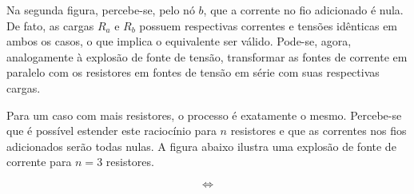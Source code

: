 \documentclass{article}
\numberwithin{equation}{section}
\newlength\Colsep
\begin{document}
Na segunda figura, percebe-se, pelo nó $b$, que a corrente no fio adicionado é nula. De fato, as cargas $R_a$ e $R_b$ possuem respectivas correntes e tensões idênticas em ambos os casos, o que implica o equivalente ser válido. Pode-se, agora, analogamente à explosão de fonte de tensão, transformar as fontes de corrente em paralelo com os resistores em fontes de tensão em série com suas respectivas cargas.

Para um caso com mais resistores, o processo é exatamente o mesmo. Percebe-se que é possível estender este raciocínio para $n$ resistores e que as correntes nos fios adicionados serão todas nulas. A figura abaixo ilustra uma explosão de fonte de corrente para $n=3$ resistores.

\noindent\begin{minipage}{\textwidth}
\begin{minipage}[c][3cm][c]{\dimexpr0.4\textwidth-0.5\Colsep\relax}
    \begin{center}
    \end{center}
\end{minipage} \hfill
\begin{minipage}[c][3cm][c]{\dimexpr0.1\textwidth-0.5\Colsep\relax}
    $$\iff$$
\end{minipage} \hfill
\begin{minipage}[c][3cm][c]{\dimexpr0.5\textwidth-0.5\Colsep\relax}
    \begin{center}
    \end{center}
\end{minipage}
\end{minipage}
\end{document}
